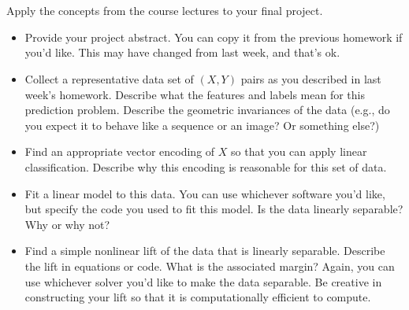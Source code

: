 \documentclass[a4paper]{article}
\begin{document}
\section{}
Apply the concepts from the course lectures to your final project.
\begin{itemize}
    \item Provide your project abstract. You can copy it from the previous homework if you’d like.
        This may have changed from last week, and that’s ok.
    \item Collect a representative data set of $(X, Y)$ pairs as you described in last week’s homework.
        Describe what the features and labels mean for this prediction problem.
        Describe the geometric invariances of the data (e.g., do you expect it to behave like a sequence or an image? Or something else?)
    \item Find an appropriate vector encoding of $X$ so that you can apply linear classification.
        Describe why this encoding is reasonable for this set of data.
    \item Fit a linear model to this data. You can use whichever software you’d like, but specify the code you used to fit this model. Is the data linearly separable? Why or why not?
    \item Find a simple nonlinear lift of the data that is linearly separable.
        Describe the lift in equations or code.
        What is the associated margin? Again, you can use whichever solver you’d like to make the data separable.
        Be creative in constructing your lift so that it is computationally efficient to compute.
\end{itemize}
\end{document}
